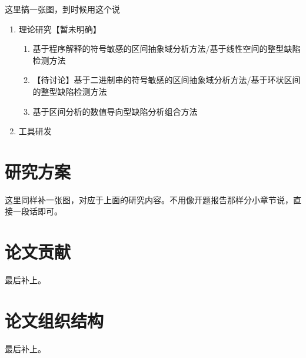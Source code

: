  这里搞一张图，到时候用这个说
 
 \begin{enumerate}
 	
 	\item 理论研究【暂未明确】
	 	\begin{enumerate}
	 		\item 基于程序解释的符号敏感的区间抽象域分析方法/基于线性空间的整型缺陷检测方法
	 		\item 【待讨论】基于二进制串的符号敏感的区间抽象域分析方法/基于环状区间的整型缺陷检测方法
	 		\item 基于区间分析的数值导向型缺陷分析组合方法
	 	\end{enumerate}
 	
 	\item 工具研发
 	
 \end{enumerate}
 
 \section{研究方案}
 
 这里同样补一张图，对应于上面的研究内容。不用像开题报告那样分小章节说，直接一段话即可。
 
 \section{论文贡献}
 
 最后补上。
 
 \section{论文组织结构}
 
 最后补上。